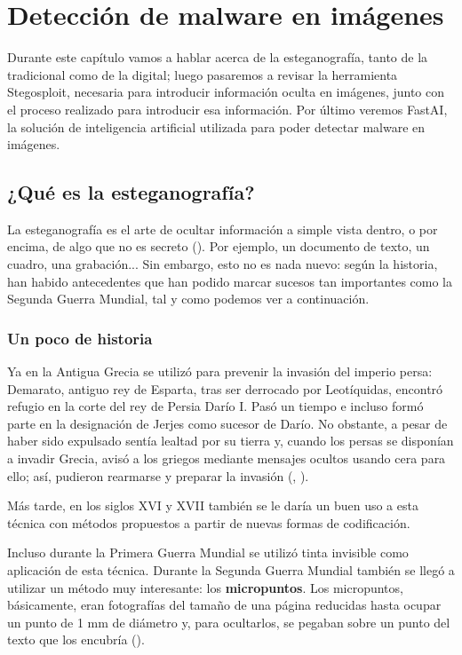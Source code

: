 \chapter{Detección de malware en imágenes}
\label{ch:det_mal}

Durante este capítulo vamos a hablar acerca de la esteganografía, tanto de la tradicional como de la digital; luego pasaremos a revisar la herramienta Stegosploit, necesaria para introducir información oculta en imágenes, junto con el proceso realizado para introducir esa información. Por último veremos FastAI, la solución de inteligencia artificial utilizada para poder detectar malware en imágenes.

\section{¿Qué es la esteganografía?}

La esteganografía es el arte de ocultar información a simple vista dentro, o por encima, de algo que no es secreto (\cite{esteganografia-digital}). Por ejemplo, un documento de texto, un cuadro, una grabación... Sin embargo, esto no es nada nuevo: según la historia, han habido antecedentes que han podido marcar sucesos tan importantes como la Segunda Guerra Mundial, tal y como podemos ver a continuación.%

\subsection{Un poco de historia}

Ya en la Antigua Grecia se utilizó para prevenir la invasión del imperio persa: Demarato, antiguo rey de Esparta, tras ser derrocado por Leotíquidas, encontró refugio en la corte del rey de Persia Darío I. Pasó un tiempo e incluso formó parte en la designación de Jerjes como sucesor de Darío. No obstante, a pesar de haber sido expulsado sentía lealtad por su tierra y, cuando los persas se disponían a invadir Grecia, avisó a los griegos mediante mensajes ocultos usando cera para ello; así, pudieron rearmarse y preparar la invasión (\cite{demarato}, \cite{cera-micropuntos}). %

Más tarde, en los siglos XVI y XVII también se le daría un buen uso a esta técnica con métodos propuestos a partir de nuevas formas de codificación.

Incluso durante la Primera Guerra Mundial se utilizó tinta invisible como aplicación de esta técnica. Durante la Segunda Guerra Mundial también se llegó a utilizar un método muy interesante: los \textbf{micropuntos}. Los micropuntos, básicamente, eran fotografías del tamaño de una página reducidas hasta ocupar un punto de 1 mm de diámetro y, para ocultarlos, se pegaban sobre un punto del texto que los encubría (\cite{cera-micropuntos}). %

